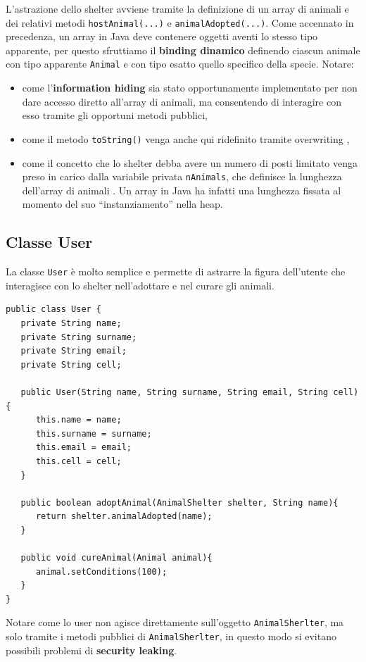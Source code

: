 \documentclass[a4paper,11pt]{article}
\begin{document}
L'astrazione dello shelter avviene tramite la definizione di un array di animali e dei relativi metodi {\tt hostAnimal(...)} e {\tt animalAdopted(...)}. Come accennato in precedenza, un array in Java deve contenere oggetti aventi lo stesso tipo apparente, per questo sfruttiamo il \textbf{binding dinamico} definendo ciascun animale con tipo apparente {\tt Animal} e con tipo esatto quello specifico della specie.
Notare:
\begin{itemize}
    \item come l'\textbf{information hiding} sia stato opportunamente implementato per non dare accesso diretto all'array di animali, ma consentendo di interagire con esso tramite gli opportuni metodi pubblici\cite{java},
    \item come il metodo {\tt toString()} venga anche qui ridefinito tramite overwriting \cite{java},
    \item come il concetto che lo shelter debba avere un numero di posti limitato venga preso in carico dalla variabile privata {\tt nAnimals}, che definisce la lunghezza dell'array di animali \cite{java_book}. Un array in Java ha infatti una lunghezza fissata al momento del suo ``instanziamento'' nella heap.
\end{itemize}


\subsection{Classe User}

La classe {\tt User} è molto semplice e permette di astrarre la figura dell'utente che interagisce con lo shelter nell'adottare e nel curare gli animali.

\begin{lstlisting}[caption={AnimalShelter.java}]
public class User {
   private String name;
   private String surname;
   private String email;
   private String cell;

   public User(String name, String surname, String email, String cell){
      this.name = name;
      this.surname = surname;
      this.email = email;
      this.cell = cell;
   }

   public boolean adoptAnimal(AnimalShelter shelter, String name){
      return shelter.animalAdopted(name);
   }

   public void cureAnimal(Animal animal){
      animal.setConditions(100);
   }
}
\end{lstlisting}

Notare come lo user non agisce direttamente sull'oggetto {\tt AnimalSherlter}, ma solo tramite i metodi pubblici di {\tt AnimalSherlter}, in questo modo si evitano possibili problemi di \textbf{security leaking}.
\end{document}
